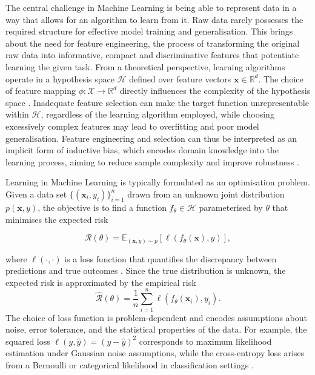 The central challenge in Machine Learning is being able to represent data in a way that allows for an algorithm to learn from it. Raw data rarely possesses the required structure for effective model training and generalisation. This brings about the need for feature engineering, the process of transforming the original raw data into informative, compact and discriminative features that potentiate learning the given task. From a theoretical perspective, learning algorithms operate in a hypothesis space $\mathcal{H}$ defined over feature vectors $\mathbf{x} \in \mathbb{R}^d$. The choice of feature mapping $\phi: \mathcal{X} \rightarrow \mathbb{R}^d$ directly influences the complexity of the hypothesis space \cite{Hastie2009}. Inadequate feature selection can make the target function unrepresentable within $\mathcal{H}$, regardless of the learning algorithm employed, while choosing excessively complex features may lead to overfitting and poor model generalisation. Feature engineering and selection can thus be interpreted as an implicit form of inductive bias, which encodes domain knowledge into the learning process, aiming to reduce sample complexity and improve robustness \cite{Bishop2006}. 

Learning in Machine Learning is typically formulated as an optimisation problem. Given a data set $\{(\mathbf{x}_i, y_i)\}_{i=1}^n$ drawn from an unknown joint distribution $p(\mathbf{x}, y)$, the objective is to find a function $f_\theta \in \mathcal{H}$ parameterised by $\theta$ that minimises the expected risk

\[
\mathcal{R}(\theta) = \mathbb{E}_{(\mathbf{x}, y) \sim p} \left[ \ell(f_\theta(\mathbf{x}), y) \right],
\]

where $\ell(\cdot,\cdot)$ is a loss function that quantifies the discrepancy between predictions and true outcomes \cite{Vapnik1998}. Since the true distribution is unknown, the expected risk is approximated by the empirical risk
\begin{equation}
\hat{\mathcal{R}}(\theta) = \frac{1}{n} \sum_{i=1}^n \ell(f_\theta(\mathbf{x}_i), y_i).
\end{equation}
The choice of loss function is problem-dependent and encodes assumptions about noise, error tolerance, and the statistical properties of the data. For example, the squared loss $\ell(y,\hat{y}) = (y-\hat{y})^2$ corresponds to maximum likelihood estimation under Gaussian noise assumptions, while the cross-entropy loss arises from a Bernoulli or categorical likelihood in classification settings \cite{Bishop2006}.

